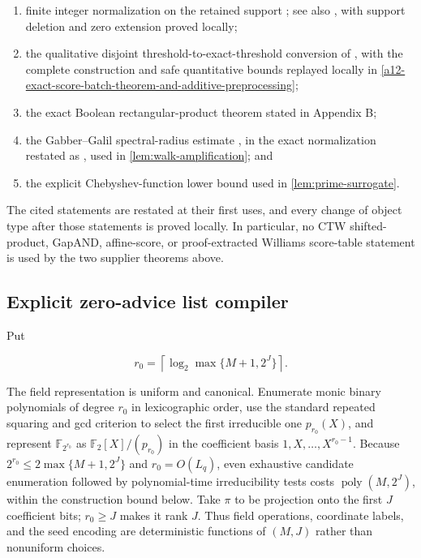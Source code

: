 \documentclass[11pt,letterpaper]{article}
\newcommand{\cref}[1]{\ref{#1}}
\theoremstyle{definition}
\theoremstyle{remark}
\begin{document}
\begin{enumerate}
\def\labelenumi{\arabic{enumi}.}
\item
  finite integer normalization on the retained support \cite{MTT61}; see
  also \cite[Lemma 3.2]{CTW26}, with support deletion and zero extension
  proved locally;
\item
  the qualitative disjoint threshold-to-exact-threshold conversion of
  \cite[Proposition 18(2) and Appendix B, Lemmas 48--49]{CW19}, with
  the complete construction and safe quantitative bounds replayed
  locally in \cref{a12-exact-score-batch-theorem-and-additive-preprocessing};
\item
  the exact Boolean rectangular-product theorem stated in Appendix B;
\item
  the Gabber--Galil spectral-radius estimate \cite{GG81}, in the exact
  normalization restated as \cite[Theorem 8.2]{HLW06}, used in
  \cref{lem:walk-amplification}; and
\item
  the explicit Chebyshev-function lower bound
  \cite[Theorem 4, eq. (3.14)]{RS62} used in \cref{lem:prime-surrogate}.
\end{enumerate}

The cited statements are restated at their first uses, and every change
of object type after those statements is proved locally. In particular,
no CTW shifted-product, GapAND, affine-score, or proof-extracted
Williams score-table statement is used by the two supplier theorems
above.

\subsection{Explicit zero-advice list
compiler}\label{a10-explicit-zero-advice-list-compiler}

Put

\[
r_0
{}={}
\left\lceil
\log_2\max\{M+1,2^J\}
\right\rceil.
\]

The field representation is uniform and canonical. Enumerate monic
binary polynomials of degree \(r_0\) in lexicographic order, use the
standard repeated squaring and gcd criterion to select the first
irreducible one \(p_{r_0}(X)\), and represent \(\mathbb F_{2^{r_0}}\) as
\(\mathbb F_2[X]/(p_{r_0})\) in the coefficient basis
\(1,X,\ldots,X^{r_0-1}\). Because \(2^{r_0}\le
2\max\{M+1,2^J\}\) and \(r_0=O(L_q)\), even exhaustive candidate
enumeration followed by polynomial-time irreducibility tests costs
\(\operatorname{poly}(M,2^J)\), within the construction bound below.
Take \(\pi\) to be projection onto the first \(J\) coefficient bits;
\(r_0\ge J\) makes it rank \(J\). Thus field operations, coordinate
labels, and the seed encoding are deterministic functions of \((M,J)\)
rather than nonuniform choices.
\end{document}
